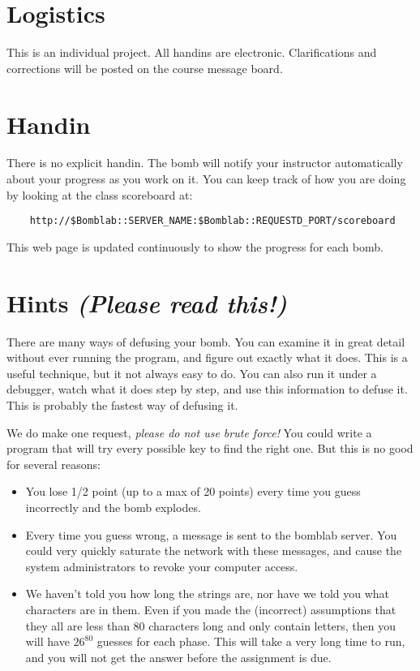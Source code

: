 \documentclass[11pt]{article}
\begin{document}
\section*{Logistics}

This is an individual project. All handins are electronic.
Clarifications and corrections will be posted on the course message
board.


\section*{Handin}

There is no explicit handin. The bomb will notify your instructor
automatically about your progress as you work on it.  You can keep
track of how you are doing by looking at the class scoreboard at:

\begin{verbatim}
    http://$Bomblab::SERVER_NAME:$Bomblab::REQUESTD_PORT/scoreboard
\end{verbatim}

This web page is updated continuously to show the progress for
each bomb.

\section*{Hints {\em (Please read this!)}}

There are many ways of defusing your bomb.  You can examine it in
great detail without ever running the program, and figure out exactly
what it does.  This is a useful technique, but it not always easy to
do.  You can also run it under a debugger, watch what it does step
by step, and use this information to defuse it.  This is probably the
fastest way of defusing it.

We do make one request, {\em please do not use brute force!}  You could
write a program that will try every possible key to find the right
one.  But this is no good for several reasons:
\begin{itemize}
\item You lose 1/2 point (up to a max of 20 points) 
every time you guess incorrectly and the bomb explodes.  

\item Every time you guess wrong, a message is sent to the bomblab server.  
You could very quickly saturate the network with these messages, and cause
the system administrators to revoke your computer access.

\item We haven't told you how long the strings are, nor have we told you
what characters are in them.  Even if you made the (incorrect) assumptions
that they all are less than 80 characters long and only contain
letters, then you will have $26^{80}$ guesses for each phase.  This will
take a very long time to run, and you will not get the answer before
the assignment is due.
\end{itemize}
\end{document}
